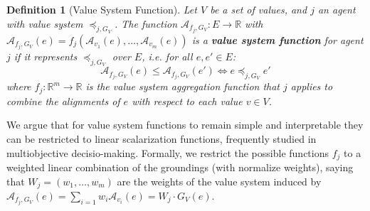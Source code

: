 \documentclass{ecai}
\newtheorem{definition}{Definition}
\newcommand{\R}{\mathbb{R}}
\newcommand{\A}{\mathcal{A}}
\begin{document}
\begin{definition}[Value System Function]\label{def:value-system-alignment-function}
Let $V$ be a set of values, and $j$ an agent with value system $\preccurlyeq_{j,G_V}$. The function $\A_{f_j,{G_V}} : E \to \R$ with $\A_{f_j,{G_V}}(e) = f_j(\A_{v_1}(e), \dots, \A_{v_m}(e))$ is a \textbf{value system function} for agent $j$ if it represents $\preccurlyeq_{j,G_V}$ over $E$, i.e. for all $e,e' \in E$:
$$\A_{f_j,{G_V}}(e) \leq \A_{f_j,{G_V}}(e') \iff e \preccurlyeq_{j,G_V} e'$$ where $f_j: {\R}^m \to \R$ is the \textit{value system aggregation function} that $j$ applies to combine the alignments of $e$ with respect to each value $v \in V$. 
\end{definition} 

We argue that for value system functions to remain simple and interpretable they can be restricted to linear scalarization functions, frequently studied in multiobjective decisio-making. Formally, we restrict the possible functions $f_j$ to a weighted linear combination of the groundings (with normalize weights), saying that $W_j = (w_1, \dots, w_m)$ are the weights of the value system induced by $\A_{f_j,{G_V}}(e) = \sum_{i=1}w_i\A_{v_i}(e)= W_j\cdot G_V(e)$.



\end{document}
